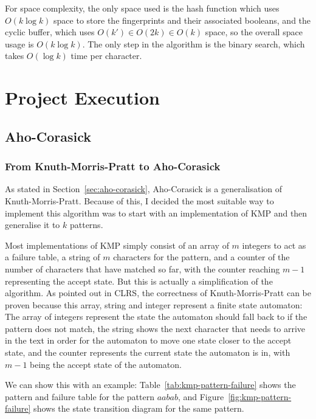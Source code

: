 \documentclass[ %
                    author={Dominic Joseph Moylett},
                    degree={MEng},
                     title={Dictionary Matching with Fingerprints},
                  subtitle={An Empirical Analysis},
                      type={research},
                      year={2015} ]{dissertation}
\begin{document}
For space complexity, the only space used is the hash function which uses $O(k\log k)$ space to store the fingerprints and their associated booleans, and the cyclic buffer, which uses $O(k') \in O(2k) \in O(k)$ space, so the overall space usage is $O(k\log k)$. The only step in the algorithm is the binary search, which takes $O(\log k)$ time per character.


\chapter{Project Execution}
\label{chap:execution}

\section{Aho-Corasick}

\subsection{From Knuth-Morris-Pratt to Aho-Corasick}

As stated in Section~\ref{sec:aho-corasick}, Aho-Corasick\cite{Aho:1975:ESM:360825.360855} is a generalisation of Knuth-Morris-Pratt. Because of this, I decided the most suitable way to implement this algorithm was to start with an implementation of KMP and then generalise it to $k$ patterns.

Most implementations of KMP simply consist of an array of $m$ integers to act as a failure table, a string of $m$ characters for the pattern, and a counter of the number of characters that have matched so far, with the counter reaching $m - 1$ representing the accept state. But this is actually a simplification of the algorithm. As pointed out in CLRS\cite{clrs:kmp}, the correctness of Knuth-Morris-Pratt can be proven because this array, string and integer represent a finite state automaton: The array of integers represent the state the automaton should fall back to if the pattern does not match, the string shows the next character that needs to arrive in the text in order for the automaton to move one state closer to the accept state, and the counter represents the current state the automaton is in, with $m - 1$ being the accept state of the automaton.

We can show this with an example: Table~\ref{tab:kmp-pattern-failure} shows the pattern and failure table for the pattern $aabab$, and Figure~\ref{fig:kmp-pattern-failure} shows the state transition diagram for the same pattern.
\end{document}
